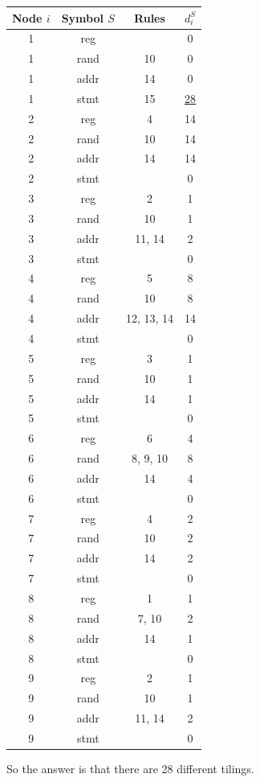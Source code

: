 \begin{minipage}[c]{.5\textwidth}
\begin{tabular}{|c|c|c|c|}

\hline
Node $i$ & Symbol $S$ & Rules & $d_i^S$ \\
\hline
1 & reg & & 0 \\
\hline
1 & rand & 10 & 0 \\
\hline
1 & addr & 14 & 0 \\
\hline
1 & stmt & 15 & \underline{28} \\
\hline

2 & reg & 4 & 14\\
\hline
2 & rand & 10 & 14\\
\hline
2 & addr & 14 & 14\\
\hline
2 & stmt & & 0 \\
\hline

3 & reg & 2 & 1\\
\hline
3 & rand & 10 & 1\\
\hline
3 & addr & 11, 14 & 2\\
\hline
3 & stmt & & 0 \\
\hline

4 & reg & 5 & 8\\
\hline
4 & rand & 10 & 8\\
\hline
4 & addr & 12, 13, 14& 14 \\
\hline
4 & stmt & & 0 \\

\hline
5 & reg & 3 & 1\\
\hline
5 & rand & 10 & 1\\
\hline
5 & addr & 14 & 1\\
\hline
5 & stmt & & 0 \\
\hline

6 & reg & 6 & 4\\
\hline
6 & rand & 8, 9, 10& 8\\
\hline
6 & addr & 14 & 4 \\
\hline
6 & stmt & & 0 \\
\hline

7 & reg & 4 & 2 \\
\hline
7 & rand & 10 & 2 \\
\hline
7 & addr & 14 & 2 \\
\hline
7 & stmt & & 0 \\
\hline

8 & reg & 1 & 1 \\
\hline
8 & rand & 7, 10 & 2 \\
\hline
8 & addr & 14 & 1\\
\hline
8 & stmt & & 0 \\
\hline

9 & reg & 2 & 1 \\
\hline
9 & rand & 10 & 1 \\
\hline
9 & addr & 11, 14& 2\\
\hline
9 & stmt & & 0 \\
\hline
\end{tabular}
\end{minipage}
So the answer is that there are 28 different tilings. \\

